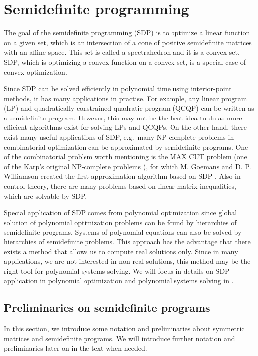 \chapter{Semidefinite programming}
The goal of the semidefinite programming (SDP) is to optimize a linear function on a given set, which is an intersection of a cone of positive semidefinite matrices with an affine space.
This set is called a spectrahedron and it is a convex set.
SDP, which is optimizing a convex function on a convex set, is a special case of convex optimization.

Since SDP can be solved efficiently in polynomial time using interior-point methods, it has many applications in practise.
For example, any linear program (LP) and quadratically constrained quadratic program (QCQP) can be written as a semidefinite program.
However, this may not be the best idea to do as more efficient algorithms exist for solving LPs and QCQPs.
On the other hand, there exist many useful applications of SDP, e.g.\ many NP-complete problems in combinatorial optimization can be approximated by semidefinite programs. 
One of the combinatorial problem worth mentioning is the MAX CUT problem (one of the Karp's original NP-complete problems \cite{karp1972}), for which M. Goemans and D. P. Williamson created the first approximation algorithm based on SDP \cite{max-cut}.
Also in control theory, there are many problems based on linear matrix inequalities, which are solvable by SDP.\@

Special application of SDP comes from polynomial optimization since global solution of polynomial optimization problems can be found by hierarchies of semidefinite programs.
Systems of polynomial equations can also be solved by hierarchies of semidefinite problems.
This approach has the advantage that there exists a method that allows us to compute real solutions only.
Since in many applications, we are not interested in non-real solutions, this method may be the right tool for polynomial systems solving.
We will focus in details on SDP application in polynomial optimization and polynomial systems solving in .

\section{Preliminaries on semidefinite programs}
In this section, we introduce some notation and preliminaries about symmetric matrices and semidefinite programs.
We will introduce further notation and preliminaries later on in the text when needed.

